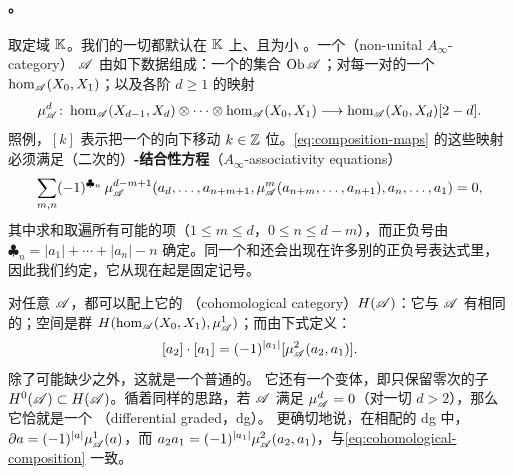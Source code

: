 \paragraph{\trCategory。}\label{sub:categories}
取定\trCoefficients{}域 $\mathbb{K}$。我们的一切\trCategory{}都默认在 $\mathbb{K}$ 上\trLinear、且为小%
\trCategory。一个\textbf{\trNonunital{}\trACategory}（non-unital $A_\infty$-category）
$\mathscr{A}$ 由如下数据组成：一个\trObject{}的集合 $\operatorname{Ob}\mathscr{A}$；对每一对\trObject{}的一个%
\trGraded\trVectorSpace{} $\hom_{\mathscr{A}}(X_0,X_1)$；以及各阶 $d\ge 1$ 的\trComposition{}映射
\begin{equation}\label{eq:composition-maps}
\mu^d_{\mathscr{A}}\colon\hom_{\mathscr{A}}(X_{d-1},X_d)\otimes\cdots\otimes\hom_{\mathscr{A}}(X_0,X_1)
\longrightarrow\hom_{\mathscr{A}}(X_0,X_d)[2-d].
\end{equation}
照例，$[k]$ 表示把一个\trVectorSpace{}的\trGraded{}向下移动 $k\in\mathbb{Z}$ 位。\eqref{eq:composition-maps}
的这些映射必须满足（二次的）\textbf{\trAinfty-结合性方程}（$A_\infty$-associativity equations）
\begin{equation}\label{eq:aoo-associativity}
\sum_{m,n}(-1)^{\clubsuit_n}\,\mu_{\mathscr{A}}^{d-m+1}
(a_d,\ldots,a_{n+m+1},\mu_{\mathscr{A}}^m(a_{n+m},\ldots,a_{n+1}),a_n,\ldots,a_1)=0,
\end{equation}
其中求和取遍所有可能的项（$1\le m\le d$，$0\le n\le d-m$），而正负号由
$\clubsuit_n=|a_1|+\cdots+|a_n|-n$ 确定。同一个和还会出现在许多别的正负号表达式里，
因此我们约定，它从现在起是固定记号。

对任意\trNonunital{}\trACategory{} $\mathscr{A}$，都可以配上它的
\textbf{\trCohomology\trCategory}（cohomological category）$H(\mathscr{A})$：它与 $\mathscr{A}$
有相同的\trObject；\trMorphism{}空间是\trCohomology{}群
$H(\hom_{\mathscr{A}}(X_0,X_1),\mu^1_{\mathscr{A}})$；而\trComposition{}由下式定义：
\begin{equation}\label{eq:cohomological-composition}
[a_2]\cdot[a_1]=(-1)^{|a_1|}[\mu^2_{\mathscr{A}}(a_2,a_1)].
\end{equation}
除了可能缺少\trIdentityMorphism{}之外，这就是一个普通的\trLinear\trGraded\trCategory。
它还有一个变体，即只保留零次\trCohomology{}的子\trCategory{}%
$H^0(\mathscr{A})\subset H(\mathscr{A})$。循着同样的思路，若\trNonunital{}\trACategory{} $\mathscr{A}$
满足 $\mu^d_{\mathscr{A}}=0$（对一切 $d>2$），那么它恰就是一个
\textbf{\trNonunital{}\trDifferential\trGraded}（differential graded，dg）\trCategory。
更确切地说，在相配的 dg \trCategory{}中，$\partial a=(-1)^{|a|}\mu^1_{\mathscr{A}}(a)$，而
$a_2a_1=(-1)^{|a_1|}\mu^2_{\mathscr{A}}(a_2,a_1)$，与\eqref{eq:cohomological-composition} 一致。

